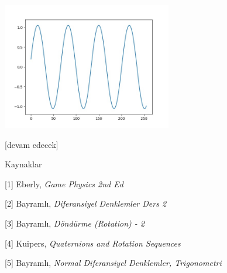 \documentclass[12pt,fleqn]{article}\usepackage{../../common}
\begin{document}
\includegraphics[width=20em]{phy_005_basics_06_01.jpg}

[devam edecek]

Kaynaklar

[1] Eberly, {\em Game Physics 2nd Ed}

[2] Bayramlı, {\em Diferansiyel Denklemler Ders 2}

[3] Bayramlı, {\em Döndürme (Rotation) - 2}

[4] Kuipers, {\em Quaternions and Rotation Sequences}

[5] Bayramlı, {\em Normal Diferansiyel Denklemler, Trigonometri}
\end{document}
